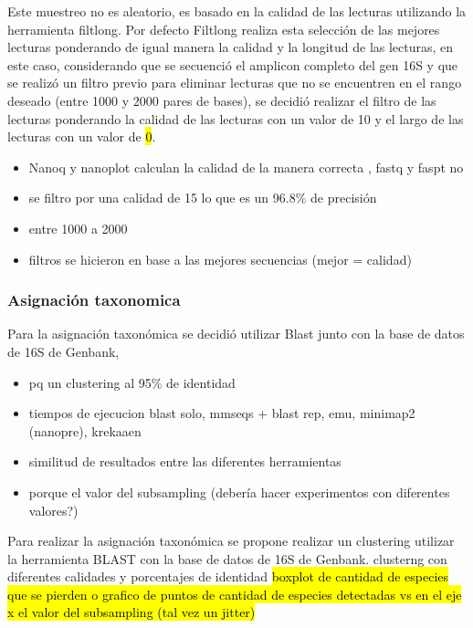Este muestreo no es aleatorio, es basado en la calidad de las lecturas utilizando la herramienta filtlong. 
Por defecto Filtlong realiza esta selección de las mejores lecturas ponderando de igual manera la calidad y la longitud de las lecturas, en este caso, considerando que se secuenció el amplicon completo del gen 16S y que se realizó un filtro previo para eliminar lecturas que no se encuentren en el rango deseado (entre 1000 y 2000 pares de bases), se decidió realizar el filtro de las lecturas ponderando la calidad de las lecturas con un valor de 10 y el largo de las lecturas con un valor de \hl{0}. 


\begin{itemize}
    \item Nanoq y nanoplot calculan la calidad de la manera correcta , fastq y faspt no
    \item se filtro por una calidad de 15 lo que es un 96.8\% de precisión
    \item entre 1000 a 2000
    \item filtros se hicieron en base a las mejores secuencias (mejor = calidad)
\end{itemize}
\subsubsection{Asignación taxonomica}
Para la asignación taxonómica se decidió utilizar Blast junto con la base de datos de 16S de Genbank, 

\begin{itemize}
    \item pq un clustering al 95\% de identidad
    \item tiempos de ejecucion blast solo, mmseqs + blast rep, emu, minimap2 (nanopre), krekaaen
    \item similitud de resultados entre las diferentes herramientas
    \item porque el valor del  subsampling (debería hacer experimentos con diferentes valores?)

\end{itemize}
Para realizar la asignación taxonómica se propone realizar un clustering utilizar la herramienta BLAST con la base de datos de 16S de Genbank.
clusterng con diferentes calidades y porcentajes de identidad \hl{boxplot de cantidad de especies que se pierden o grafico de puntos de cantidad de especies detectadas vs en el eje x el valor del subsampling (tal vez un jitter)}



